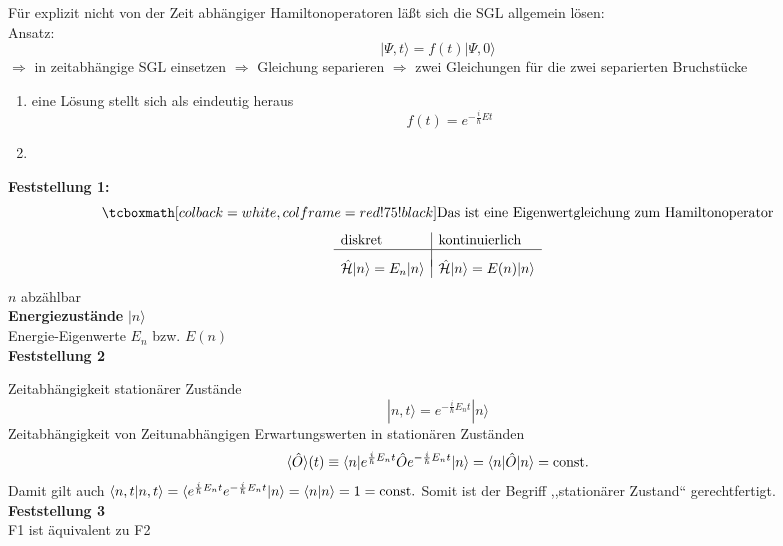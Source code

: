 Für explizit nicht von der Zeit abhängiger Hamiltonoperatoren läßt sich die SGL allgemein lösen:\\[5pt]
Ansatz:
\begin{equation*}
|\Psi,t\rangle = f(t) |\Psi,0\rangle
\end{equation*}
$ \Rightarrow $ in zeitabhängige SGL einsetzen $ \Rightarrow $ Gleichung separieren $ \Rightarrow $ zwei Gleichungen für die zwei separierten Bruchstücke
\begin{enumerate}[(1)]
	\item eine Lösung stellt sich als eindeutig heraus
	$$ f(t) = e^{-\frac{i}{\hbar} Et} $$
	\item$ \phantom{0} $\\[-30pt]
\end{enumerate}
\textbf{Feststellung 1:}
\begin{equation*}
\rmbox{\tx{Das ist eine Eigenwertgleichung zum Hamiltonoperator}}
\end{equation*}
\begin{equation*}
\begin{array}{l|l}
	\textrm{diskret} & \textrm{kontinuierlich}\\
	\hline\\[-5pt]
	\hat{\mathcal{H}} |n\rangle = E_n |n\rangle & \hat{\mathcal{H}} |n\rangle = E(n) |n\rangle\\
\end{array}
\end{equation*}
$ n $ abzählbar\\
\textbf{Energiezustände} $ |n\rangle $\\
Energie-Eigenwerte $ E_n $ bzw. $ E(n) $\\[5pt]
\textbf{Feststellung 2}
\begin{center}
	\begin{minipage}{.65\linewidth}
	\end{minipage}
\end{center}
Zeitabhängigkeit stationärer Zustände
\begin{equation*}
|n,t\rangle = e^{-\frac{i}{\hbar} E_n t} |n\rangle
\end{equation*}
Zeitabhängigkeit von Zeitunabhängigen Erwartungswerten in stationären Zuständen
\begin{equation*}
\langle \hat{O} \rangle (t) \equiv \langle n | e^{\frac{i}{\hbar} E_n t} \hat{O} e^{-\frac{i}{\hbar} E_n t} |n \rangle = \langle n | \hat{O} | n \rangle = \textrm{const.}
\end{equation*}
Damit gilt auch $ \langle n , t | n , t \rangle = \langle e^{\frac{i}{\hbar} E_n t} e^{-\frac{i}{\hbar} E_n t} | n \rangle = \langle n | n \rangle = 1 = \textrm{const.} $ Somit ist der Begriff ,,stationärer Zustand`` gerechtfertigt.\\[5pt]
\textbf{Feststellung 3}\\
F1 ist äquivalent zu F2\\[10pt]

